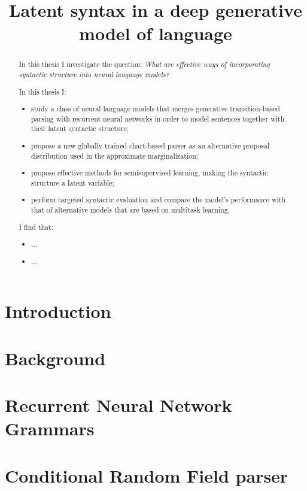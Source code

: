 \documentclass[examplefnt,biber]{../src/nowfnt} %
\title{Latent syntax in a deep generative model of language}
\begin{document}
\makeabstracttitle

\begin{abstract}
In this thesis I investigate the question: \textit{What are effective ways of incorporating syntactic structure into neural language models?}

In this thesis I:
\begin{itemize}
  \item study a class of neural language models that merges generative transition-based parsing with recurrent neural networks in order to model sentences together with their latent syntactic structure;
  \item propose a new globally trained chart-based parser as an alternative proposal distribution used in the approximate marginalization;
  \item propose effective methods for semisupervised learning, making the syntactic structure a latent variable;
  \item perform targeted syntactic evaluation and compare the model's performance with that of alternative models that are based on multitask learning.
\end{itemize}
I find that:
\begin{itemize}
  \item ...
  \item ...
\end{itemize}
\end{abstract}

\begin{acknowledgements}
\end{acknowledgements}


\chapter{Introduction}
\label{01-introduction}



\chapter{Background}
\label{02-background}



\chapter{Recurrent Neural Network Grammars}
\label{03-rnng}



\chapter{Conditional Random Field parser}
\label{04-crf}

\end{document}
